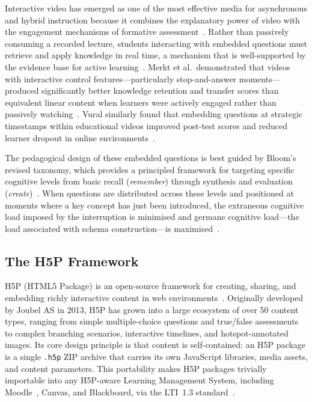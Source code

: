 Interactive video has emerged as one of the most effective media for
asynchronous and hybrid instruction because it combines the explanatory
power of video with the engagement mechanisms of formative
assessment~\cite{zhang2006}. Rather than passively consuming a recorded
lecture, students interacting with embedded questions must retrieve and
apply knowledge in real time, a mechanism that is well-supported by the
evidence base for active learning~\cite{freeman2014}. Merkt et al.\
demonstrated that videos with interactive control features---particularly
stop-and-answer moments---produced significantly better knowledge retention
and transfer scores than equivalent linear content when learners were
actively engaged rather than passively watching~\cite{merkt2011}. Vural
similarly found that embedding questions at strategic timestamps within
educational videos improved post-test scores and reduced learner dropout in
online environments~\cite{vural2013}.

The pedagogical design of these embedded questions is best guided by
Bloom's revised taxonomy, which provides a principled framework for
targeting specific cognitive levels from basic recall (\emph{remember})
through synthesis and evaluation (\emph{create})~\cite{anderson2001}. When
questions are distributed across these levels and positioned at moments
where a key concept has just been introduced, the extraneous cognitive load
imposed by the interruption is minimised and germane cognitive load---the
load associated with schema construction---is
maximised~\cite{sweller1988,chandler1991,paas2003}.

\subsection{The H5P Framework}

H5P (HTML5 Package) is an open-source framework for creating, sharing, and
embedding richly interactive content in web
environments~\cite{h5p2023,lumieducation2023}. Originally developed by
Joubel AS in 2013, H5P has grown into a large ecosystem of over 50 content
types, ranging from simple multiple-choice questions and true/false
assessments to complex branching scenarios, interactive timelines, and
hotspot-annotated images. Its core design principle is that content is
self-contained: an H5P package is a single \texttt{.h5p} ZIP archive that
carries its own JavaScript libraries, media assets, and content parameters.
This portability makes H5P packages trivially importable into any
H5P-aware Learning Management System, including Moodle~\cite{moodle2023},
Canvas, and Blackboard, via the LTI~1.3 standard~\cite{lti2019}.

